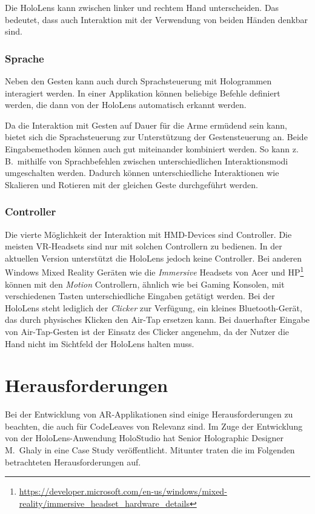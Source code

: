 Die HoloLens kann zwischen linker und rechtem Hand unterscheiden. Das bedeutet, dass auch Interaktion mit der Verwendung von beiden Händen denkbar sind.

\subsubsection*{Sprache}
Neben den Gesten kann auch durch Sprachsteuerung mit Hologrammen interagiert werden. In einer Applikation können beliebige Befehle definiert werden, die dann von der HoloLens automatisch erkannt werden.

Da die Interaktion mit Gesten auf Dauer für die Arme ermüdend sein kann, bietet sich die Sprachsteuerung zur Unterstützung der Gestensteuerung an. Beide Eingabemethoden können auch gut miteinander kombiniert werden. So kann z.\,B.\ mithilfe von Sprachbefehlen zwischen unterschiedlichen Interaktionsmodi umgeschalten werden. Dadurch können unterschiedliche Interaktionen wie Skalieren und Rotieren mit der gleichen Geste durchgeführt werden.

\subsubsection*{Controller}
Die vierte Möglichkeit der Interaktion mit HMD-Devices sind Controller. Die meisten VR-Headsets sind nur mit solchen Controllern zu bedienen. In der aktuellen Version unterstützt die HoloLens jedoch keine Controller. Bei anderen Windows Mixed Reality Geräten wie die \textit{Immersive} Headsets von Acer und HP\footnote{\url{https://developer.microsoft.com/en-us/windows/mixed-reality/immersive_headset_hardware_details}} können mit den \textit{Motion} Controllern, ähnlich wie bei Gaming Konsolen, mit verschiedenen Tasten unterschiedliche Eingaben getätigt werden. Bei der HoloLens steht lediglich der \textit{Clicker} zur Verfügung, ein kleines Bluetooth-Gerät, das durch physisches Klicken den Air-Tap ersetzen kann. Bei dauerhafter Eingabe von Air-Tap-Gesten ist der Einsatz des Clicker angenehm, da der Nutzer die Hand nicht im Sichtfeld der HoloLens halten muss.

\section{Herausforderungen}

Bei der Entwicklung von AR-Applikationen sind einige Herausforderungen zu beachten, die auch für CodeLeaves von Relevanz sind. Im Zuge der Entwicklung von der HoloLens-Anwendung HoloStudio hat Senior Holographic Designer M.\ Ghaly in \cite{windows2017casestudy3} eine Case Study veröffentlicht. Mitunter traten die im Folgenden betrachteten Herausforderungen auf.

